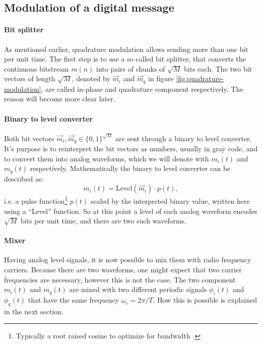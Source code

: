 
\subsection{Modulation of a digital message}

\paragraph{Bit splitter}

As mentioned earlier, quadrature modulation allows sending more than one bit per unit time. The first step is to use a so called bit splitter, that converts the continuous bitstream \(m(n)\) into pairs of chunks of \(\sqrt{M}\) bits each. The two bit vectors of length \(\sqrt{M}\), denoted by \(\vec{m}_i\) and \(\vec{m}_q\) in figure \ref{fig:quadrature-modulation}, are called in-phase and quadrature component respectively\cite{Hsu}. The reason will become more clear later.

\paragraph{Binary to level converter}


Both bit vectors \(\vec{m}_i, \vec{m}_q \in \{0,1\}^{\sqrt{M}}\) are sent through a binary to level converter. It's purpose is to reinterpret the bit vectors as numbers, usually in gray code, and to convert them into analog waveforms, which we will denote with \(m_i(t)\) and \(m_q(t)\) respectively. Mathematically the binary to level converter can be described as:
\begin{equation}
	m_i(t) = \text{Level}(\vec{m}_i) \cdot p(t),
\end{equation}
i.e. a pulse function\footnote{Typically a root raised cosine to optimize for bandwidth \cite{Hsu}.} \(p(t)\) scaled by the interpreted binary value, written here using a ``Level'' function. So at this point a level of each analog waveform encodes \(\sqrt{M}\) bits per unit time, and there are two such waveforms.


\paragraph{Mixer}

Having analog level signals, it is now possible to mix them with radio frequency carriers. Because there are two waveforms, one might expect that two carrier frequencies are necessary, however this is not the case. The two component \(m_i(t)\) and \(m_q(t)\) are mixed with two different periodic signals \(\phi_i(t)\) and \(\phi_q(t)\) that have the same frequency \(\omega_c = 2\pi / T\). How this is possible is explained in the next section.


